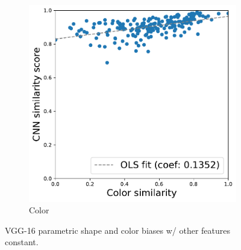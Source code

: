 \begin{figure}[h!]
\begin{center}
\begin{subfigure}[b]{0.235\textwidth}
            \includegraphics[width=\linewidth]{figures/vgg_color_parametric_others_constant.pdf}
            \caption{Color}
        \end{subfigure}
    \end{center}
    \caption{VGG-16 parametric shape and color biases w/ other features constant.}
    \label{fig:parametric_others_constant}
\end{figure}

